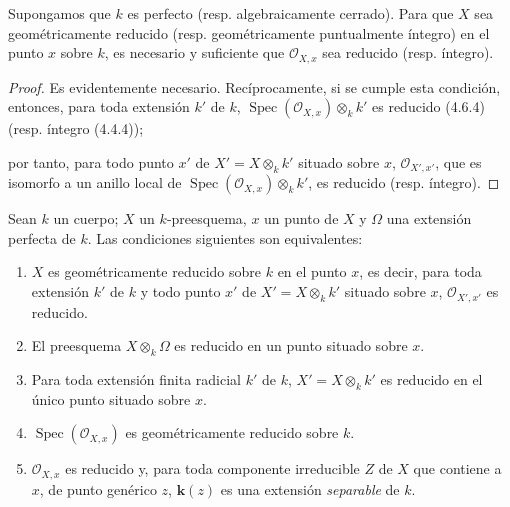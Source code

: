 \begin{corollary}[4.6.11]
\label{IV.2.4.6.11-fr}
Supongamos que $k$ es perfecto \textup{(resp.} algebraicamente cerrado). Para que $X$
sea geométricamente reducido \textup{(resp.} geométricamente puntualmente íntegro) en
el punto $x$ sobre $k$, es necesario y suficiente que $\mathcal O_{X,x}$ sea
reducido \textup{(resp.} íntegro).
\end{corollary}

\begin{proof}
Es evidentemente necesario. Recíprocamente, si se cumple esta condición,
entonces, para toda extensión $k'$ de $k$,
$\operatorname{Spec}(\mathcal O_{X,x})\otimes_k k'$ es reducido (4.6.4)
(resp. íntegro (4.4.4));


por tanto, para todo punto $x'$ de $X'=X\otimes_k k'$ situado sobre $x$,
$\mathcal O_{X',x'}$, que es isomorfo a un anillo local de
$\operatorname{Spec}(\mathcal O_{X,x})\otimes_k k'$, es reducido (resp.
íntegro).
\end{proof}

\begin{proposition}[4.6.12]
\label{IV.2.4.6.12-fr}
Sean $k$ un cuerpo; $X$ un $k$-preesquema, $x$ un punto de $X$ y $\Omega$ una
extensión perfecta de $k$. Las condiciones siguientes son equivalentes:
\begin{enumerate}
\item[\textup{a)}] $X$ es geométricamente reducido sobre $k$ en el punto $x$, es
decir, para toda extensión $k'$ de $k$ y todo punto $x'$ de
$X'=X\otimes_k k'$ situado sobre $x$, $\mathcal O_{X',x'}$ es reducido.
\item[\textup{b)}] El preesquema $X\otimes_k\Omega$ es reducido en un punto situado
sobre $x$.
\item[\textup{c)}] Para toda extensión finita radicial $k'$ de $k$,
$X'=X\otimes_k k'$ es reducido en el único punto situado sobre $x$.
\item[\textup{d)}] $\operatorname{Spec}(\mathcal O_{X,x})$ es geométricamente reducido
sobre $k$.
\item[\textup{e)}] $\mathcal O_{X,x}$ es reducido y, para toda componente irreducible
$Z$ de $X$ que contiene a $x$, de punto genérico $z$, $\boldsymbol{k}(z)$ es una extensión
\emph{separable} de $k$.
\end{enumerate}
\end{proposition}

